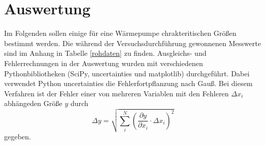 \documentclass[11pt]{article}
\begin{document}
\section{Auswertung}
Im Folgenden sollen einige f\"ur eine W\"armepumpe chrakteritischen Gr\"o\ss en bestimmt werden. Die w\"ahrend der Versuchsdurchf\"uhrung gewonnenen Messwerte sind im Anhang in Tabelle \ref{rohdaten} zu finden. Ausgleichs- und Fehlerrechnungen in der Auswertung wurden mit verschiedenen Pythonbibliotheken (SciPy, uncertainties und matplotlib) durchgef\"uhrt. Dabei verwendet Python uncertainties die Fehlerfortpflanzung nach Gau\ss. Bei diesem Verfahren ist der Fehler einer von mehreren Variablen mit den Fehleren $\Delta x_i$ abh\"angeden Gr\"o\ss e $y$ durch 
\begin{equation}
\Delta y = \sqrt{\sum_i^N (\frac{\partial y}{\partial x_i} \cdot \Delta x_i)^2}
\end{equation}
gegeben. 
\end{document}
